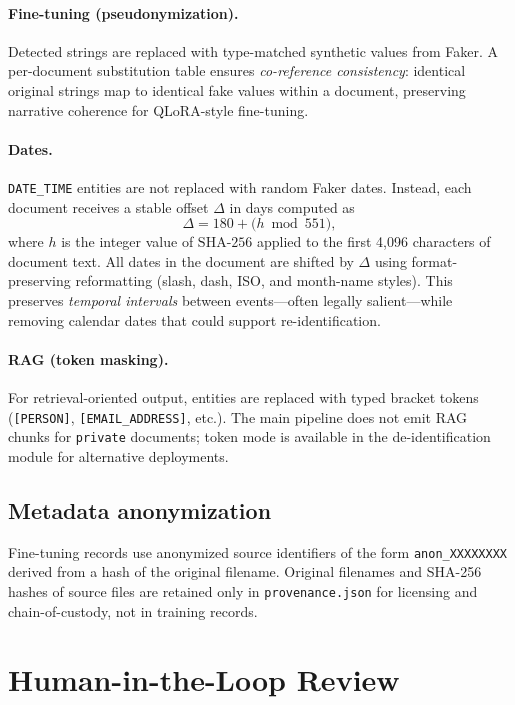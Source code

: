 \documentclass[11pt,a4paper]{article}
\begin{document}
\paragraph{Fine-tuning (pseudonymization).}
Detected strings are replaced with type-matched synthetic values from Faker. A per-document substitution table ensures \emph{co-reference consistency}: identical original strings map to identical fake values within a document, preserving narrative coherence for QLoRA-style fine-tuning.

\paragraph{Dates.}
\texttt{DATE\_TIME} entities are not replaced with random Faker dates. Instead, each document receives a stable offset $\Delta$ in days computed as
\[
\Delta = 180 + \bigl(h \bmod 551\bigr),
\]
where $h$ is the integer value of $\mathrm{SHA\text{-}256}$ applied to the first 4{,}096 characters of document text. All dates in the document are shifted by $\Delta$ using format-preserving reformatting (slash, dash, ISO, and month-name styles). This preserves \emph{temporal intervals} between events---often legally salient---while removing calendar dates that could support re-identification.

\paragraph{RAG (token masking).}
For retrieval-oriented output, entities are replaced with typed bracket tokens (\texttt{[PERSON]}, \texttt{[EMAIL\_ADDRESS]}, etc.). The main pipeline does not emit RAG chunks for \texttt{private} documents; token mode is available in the de-identification module for alternative deployments.

\subsection{Metadata anonymization}

Fine-tuning records use anonymized source identifiers of the form \texttt{anon\_XXXXXXXX} derived from a hash of the original filename. Original filenames and SHA-256 hashes of source files are retained only in \texttt{provenance.json} for licensing and chain-of-custody, not in training records.

\section{Human-in-the-Loop Review}
\end{document}
